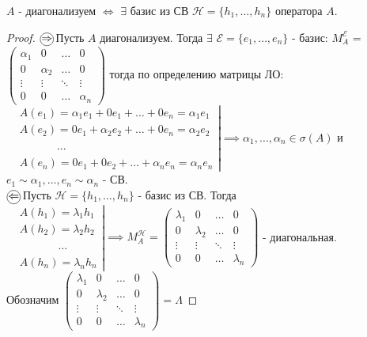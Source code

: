 \documentclass[../main.tex]{subfiles}
\begin{document}
\begin{theorem}
    $A$ - диагонализуем $\Leftrightarrow$ $\exists$ базис из СВ $\mathcal{H} = \{ h_{1},\dots,h_{n}\}$ оператора $A$.
\end{theorem}
\begin{proof}
    $\tcircle{$\implies$}$ Пусть $A$ диагонализуем. Тогда $\exists$ $\mathcal{E} = \{ e_{1} , \dots ,e_{n}\}$ - базис: $M_{A}^{\mathcal{E}}$ = $\begin{pmatrix}
        \alpha_{1} & 0 & \dots & 0 \\
        0 & \alpha_{2} & \dots & 0 \\
        \vdots & \vdots & \ddots & \vdots \\
        0 & 0 & \dots & \alpha_{n}
    \end{pmatrix}$ тогда по определению матрицы ЛО: 
    $
    \left.\begin{aligned}
        &A(e_{1}) = \alpha_{1}e_{1} + 0e_{1} + \dots + 0e_{n} = \alpha_{1}e_{1} \\
        &A(e_{2}) = 0e_{1} + \alpha_{2}e_{2} + \dots + 0e_{n} = \alpha_{2}e_{2} \\
        &\phantom{A(e_{3})}\dots \\
        &A(e_{n}) = 0e_{1} + 0e_{2} + \dots + \alpha_{n}e_{n} = \alpha_{n}e_{n}
    \end{aligned}\right| \implies \alpha_{1},\dots,\alpha_{n} \in \sigma(A) $ и\\ $e_{1}\sim \alpha_{1}, \dots , e_{n} \sim \alpha_{n}$ - СВ.
    \\ $\tcircle{$\impliedby$}$ Пусть $\mathcal{H} = \{ h_{1},\dots,h_{n}\}$ - базис из СВ. Тогда $
   \left.\begin{aligned}
        &A(h_{1}) = \lambda_{1}h_{1} \\
        &A(h_{2}) = \lambda_{2}h_{2} \\
        &\phantom{A(h_{3})}\dots \\
        &A(h_{n}) = \lambda_{n}h_{n}
    \end{aligned}\right| \implies M_{A}^{\mathcal{H}} = \begin{pmatrix}
        \lambda_{1} & 0 & \dots & 0 \\
        0 & \lambda_{2} & \dots & 0 \\
        \vdots & \vdots & \ddots & \vdots \\
        0 & 0 & \dots & \lambda_{n}
    \end{pmatrix}$ - диагональная. 
    \\ Обозначим $\begin{pmatrix}
        \lambda_{1} & 0 & \dots & 0 \\
        0 & \lambda_{2} & \dots & 0 \\
        \vdots & \vdots & \ddots & \vdots \\
        0 & 0 & \dots & \lambda_{n}
    \end{pmatrix} =\Lambda$
\end{proof}
\end{document}
